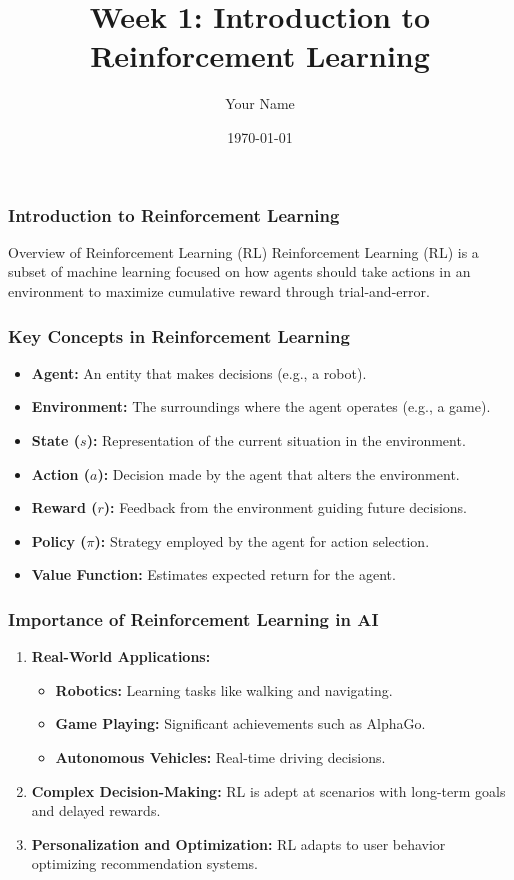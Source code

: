 \documentclass{beamer}
\title{Week 1: Introduction to Reinforcement Learning}
\author{Your Name}
\institute{Your Institution}
\date{\today}
\begin{document}
\frame{\titlepage}

\begin{frame}[fragile]
    \frametitle{Introduction to Reinforcement Learning}
    \begin{block}{Overview of Reinforcement Learning (RL)}
        Reinforcement Learning (RL) is a subset of machine learning focused on how agents should take actions in an environment to maximize cumulative reward through trial-and-error.
    \end{block}
\end{frame}

\begin{frame}[fragile]
    \frametitle{Key Concepts in Reinforcement Learning}
    \begin{itemize}
        \item \textbf{Agent:} An entity that makes decisions (e.g., a robot).
        \item \textbf{Environment:} The surroundings where the agent operates (e.g., a game).
        \item \textbf{State ($s$):} Representation of the current situation in the environment.
        \item \textbf{Action ($a$):} Decision made by the agent that alters the environment.
        \item \textbf{Reward ($r$):} Feedback from the environment guiding future decisions.
        \item \textbf{Policy ($\pi$):} Strategy employed by the agent for action selection.
        \item \textbf{Value Function:} Estimates expected return for the agent.
    \end{itemize}
\end{frame}

\begin{frame}[fragile]
    \frametitle{Importance of Reinforcement Learning in AI}
    \begin{enumerate}
        \item \textbf{Real-World Applications:}
            \begin{itemize}
                \item \textbf{Robotics:} Learning tasks like walking and navigating.
                \item \textbf{Game Playing:} Significant achievements such as AlphaGo.
                \item \textbf{Autonomous Vehicles:} Real-time driving decisions.
            \end{itemize}
        \item \textbf{Complex Decision-Making:} 
            RL is adept at scenarios with long-term goals and delayed rewards.
        \item \textbf{Personalization and Optimization:}
            RL adapts to user behavior optimizing recommendation systems.
    \end{enumerate}
\end{frame}
\end{document}
